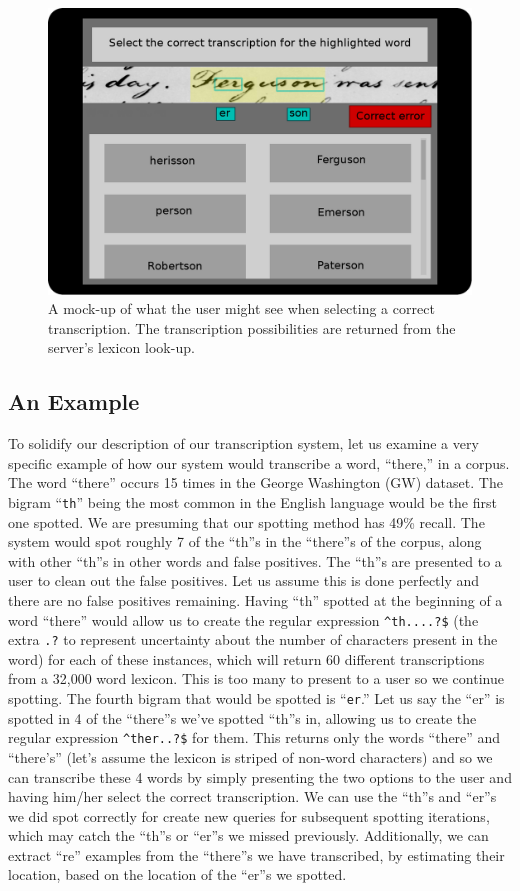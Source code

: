 \documentclass[ms]{byuprop}
\begin{document}
\begin{figure}[h]
    \centering
    \includegraphics[width=.6\textwidth]{userTask_trans}
    \caption{A mock-up of what the user might see when selecting a correct transcription. The transcription possibilities are returned from the server's lexicon look-up.}
    \label{fig:userTask_trans}
\end{figure}


\subsection{An Example}
To solidify our description of our transcription system, let us examine a very specific example of how our system would transcribe a word, ``there,'' in a corpus. The word ``there'' occurs 15 times in the George Washington (GW) dataset\cite{GW}. The bigram ``\texttt{th}'' being the most common in the English language would be the first one spotted. We are presuming that our spotting method has 49\% recall. The system would spot roughly 7 of the ``th''s in the ``there''s of the corpus, along with other ``th''s in other words and false positives. The ``th''s are presented to a user to clean out the false positives. Let us assume this is done perfectly and there are no false positives remaining. Having ``th'' spotted at the beginning of a word ``there'' would allow us to create the regular expression \texttt{{\textasciicircum}th....?\$} (the extra \texttt{.?} to represent uncertainty about the number of characters present in the word) for each of these instances, which will return 60 different transcriptions from a 32,000 word lexicon. This is too many to present to a user so we continue spotting. The fourth bigram that would be spotted is ``\texttt{er}.'' Let us say the ``er'' is spotted in 4 of the ``there''s we've spotted ``th''s in, allowing us to create the regular expression \texttt{{\textasciicircum}ther..?\$} for them. This returns only the words ``there'' and ``there's'' (let's assume the lexicon is striped of non-word characters) and so we can transcribe these 4 words by simply presenting the two options to the user and having him/her select the correct transcription. We can use the ``th''s and ``er''s we did spot correctly for create new queries for subsequent spotting iterations, which may catch the ``th''s or ``er''s we missed previously. Additionally, we can extract  ``re'' examples from the ``there''s we have transcribed, by estimating their location, based on the location of the ``er''s we spotted.
\end{document}
